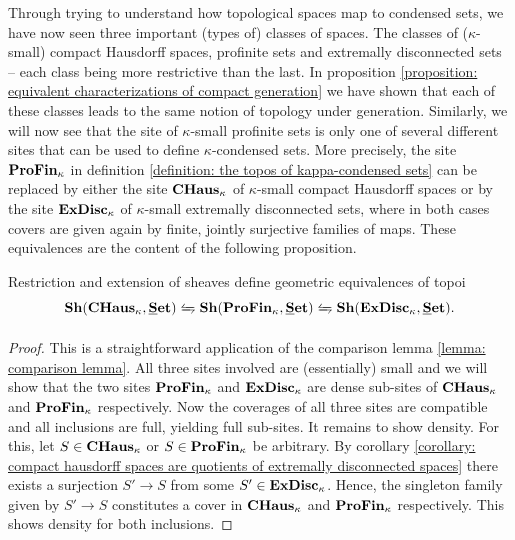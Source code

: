 Through trying to understand how topological spaces map to condensed sets, we have now seen three important (types of) classes of spaces. The classes of ($\kappa$-small) compact Hausdorff spaces, profinite sets and extremally disconnected sets -- each class being more restrictive than the last. In proposition \ref{proposition: equivalent characterizations of compact generation} we have shown that each of these classes leads to the same notion of topology under generation. Similarly, we will now see that the site of $\kappa$-small profinite sets is only one of several different sites that can be used to define $\kappa$-condensed sets. More precisely, the site ${\mathbf{ProFin}}_{\kappa}$ in definition \ref{definition: the topos of kappa-condensed sets} can be replaced by either the site ${{{\mathbf{CHaus}}}_{\kappa}}$ of $\kappa$-small compact Hausdorff spaces or by the site ${\mathbf{ExDisc}}_{\kappa}$ of $\kappa$-small extremally disconnected sets, where in both cases covers are given again by finite, jointly surjective families of maps. These equivalences are the content of the following proposition.
\begin{proposition}
	\label{proposition: independence to the defining site}
	
	Restriction and extension of sheaves define geometric equivalences of topoi
		$$\Sheaves{\boundedCHaus{\kappa}}{\Set} \xleftrightarrows{}{} \Sheaves{\boundedProFiniteSets{\kappa}}{\Set}\xleftrightarrows{}{} \Sheaves{\boundedExtremallyDisconnectedSets{\kappa}}{\Set}.$$
\end{proposition}
\begin{proof}
	This is a straightforward application of the comparison lemma \ref{lemma: comparison lemma}. All three sites involved are (essentially) small and we will show that the two sites ${\mathbf{ProFin}}_{\kappa}$ and ${\mathbf{ExDisc}}_{\kappa}$ are dense sub-sites of ${{{\mathbf{CHaus}}}_{\kappa}}$ and ${\mathbf{ProFin}}_{\kappa}$ respectively. Now the coverages of all three sites are compatible and all inclusions are full, yielding full sub-sites. It remains to show density. For this, let $S\in{{{\mathbf{CHaus}}}_{\kappa}}$ or $S\in {\mathbf{ProFin}}_{\kappa}$ be arbitrary. By corollary \ref{corollary: compact hausdorff spaces are quotients of extremally disconnected spaces} there exists a surjection $S'\to S$ from some $S' \in {\mathbf{ExDisc}}_{\kappa}$. Hence, the singleton family given by $S'\to S$ constitutes a cover in ${{{\mathbf{CHaus}}}_{\kappa}}$ and ${\mathbf{ProFin}}_{\kappa}$ respectively. This shows density for both inclusions.
\end{proof}
	
